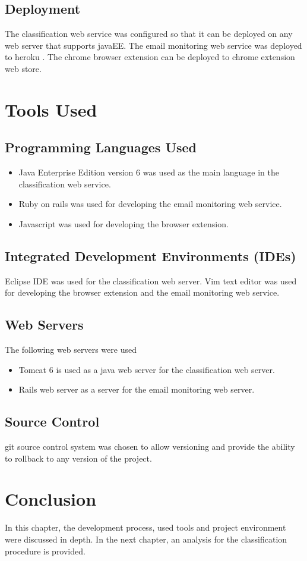 \subsection{Deployment}
The classification web service was configured so that it can be deployed on any 
web server that supports javaEE. The email monitoring web service was deployed 
to heroku \cite{HEROKU}. The chrome browser extension can be deployed to chrome 
extension web store.

\section{Tools Used}

\subsection{Programming Languages Used}
\begin{itemize}
  \item Java Enterprise Edition version 6 was used as the main language in the 
  classification web service.
  \item Ruby on rails \cite{ROR} was used for developing the email monitoring 
  web service.
  \item Javascript was used for developing the browser extension.
\end{itemize}

\subsection{Integrated Development Environments (IDEs)}
Eclipse IDE was used for the classification web server.
Vim text editor was used for developing the browser extension and the email 
monitoring web service.

\subsection{Web Servers}
The following web servers were used
\begin{itemize}
  \item Tomcat 6 is used as a java web server for the classification web server.
  \item Rails web server as a server for the email monitoring web server.
\end{itemize}

\subsection{Source Control}
git source control system \cite{GIT} was chosen to allow versioning and provide 
the ability to rollback to any version of the project.
\section{Conclusion}
In this chapter, the development process, used tools and project environment were 
discussed in depth. In the next chapter, an analysis for the classification 
procedure is provided.
